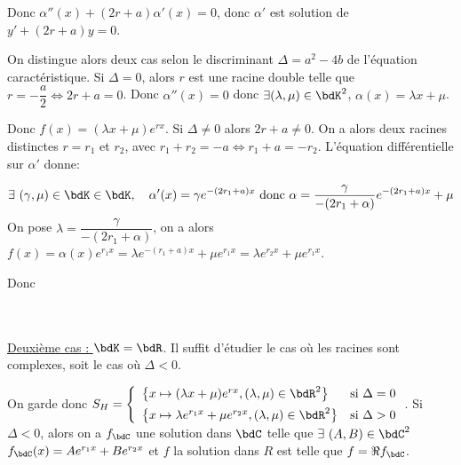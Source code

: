 \documentclass[a4paper,french,bookmarks]{article}
\begin{document}
\begin{enumerate}
{    Donc $\alpha''(x) + (2r+a)\alpha'(x) = 0$, donc $\alpha'$ est solution de $y' + (2r+a)y = 0$. 
        
    On distingue alors deux cas selon le discriminant $\Delta = a^2 - 4b$ de l'équation caractéristique. Si $\Delta = 0$, alors $r$ est une racine double telle que $r = -\dfrac{a}{2} \iff 2r+a = 0$. Donc $\alpha''(x) = 0$ donc $\exists (\lambda,\mu) \in \bdK^2$, $\alpha(x) = \lambda x + \mu$.
    
    Donc $f(x) = \left(\lambda x + \mu\right)e^{rx}$. Si $\Delta \neq 0$ alors $2r + a \neq 0$. On a alors deux racines distinctes $r = r_1$ et $r_2$, avec $r_1 + r_2 = -a \iff r_1 + a = -r_2$. L'équation différentielle sur $\alpha'$ donne:
    
    \[ \exists \ (\gamma,\mu) \in \bdK \in \bdK, \quad \alpha'(x) = \gamma e^{-(2r_1 +a)x} \ \text{donc} \ \alpha = \dfrac{\gamma}{-(2r_1 + \alpha)}e^{-(2r_1 +a)x} + \mu \]
    On pose $\lambda = \dfrac{\gamma}{-(2r_1 + \alpha)}$, on a alors $f(x) = \alpha(x)e^{r_1x} = \lambda e^{-(r_1 +a)x}+ \mu e^{r_1x} = \lambda e^{r_2x} + \mu e^{r_1x}$.
    
    Donc 
    
    \text{}\\\text{}\\
    \underline{Deuxième cas : $\bdK = \bdR$}. Il suffit d'étudier le cas où les racines sont complexes, soit le cas où $\Delta < 0$.
    
    On garde donc $S_H = \left\lbrace\begin{array}{ll}
        \left\{ x \mapsto (\lambda x + \mu)e^{rx}, (\lambda,\mu) \in \bdR^2\right\} & \text{si} \ \Delta = 0\\[5pt]
        \left\{ x \mapsto \lambda e^{r_1x} + \mu e^{r_2x}, (\lambda,\mu) \in \bdR^2\right\} & \text{si} \ \Delta > 0
    \end{array}\right.$. Si $\Delta < 0$, alors on a $f_\bdC$ une solution dans $\bdC$ telle que $\exists \  (A, B) \in \bdC^2$ $f_\bdC(x) = Ae^{r_1x} + Be^{r_2x}$ et $f$ la solution dans $R$ est telle que $f = \Re{f_\bdC}$.
    
}
\end{enumerate}
\end{document}

